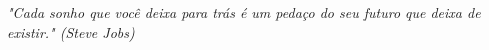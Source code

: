 \begin{epigrafe}
\vspace*{\fill}
\begin{flushright}
\textit{"Cada sonho que você deixa para trás é um pedaço do seu futuro que deixa de existir."
	 (Steve Jobs)}
\end{flushright}
\end{epigrafe}
